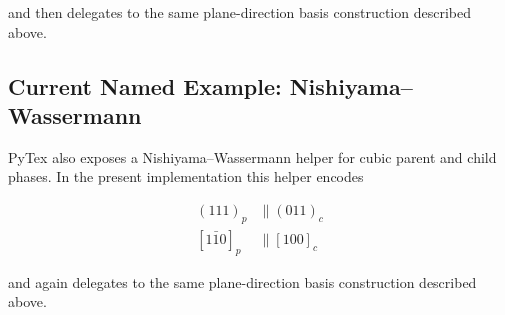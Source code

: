 and then delegates to the same plane-direction basis construction described above.

\subsection{Current Named Example: Nishiyama--Wassermann}

PyTex also exposes a Nishiyama--Wassermann helper for cubic parent and child phases. In the present
implementation this helper encodes

\begin{align}
(111)_p &\parallel (011)_c \\
[1\bar{1}0]_p &\parallel [100]_c
\end{align}

and again delegates to the same plane-direction basis construction described above.
